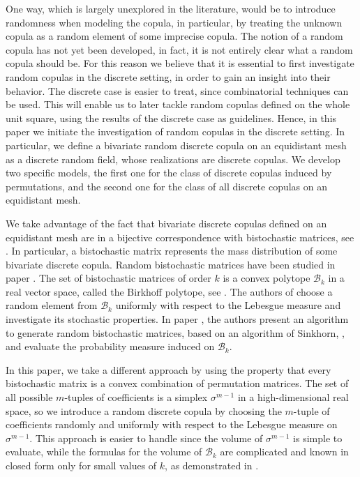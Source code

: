 \documentclass[12pt,a4paper]{amsart}
\theoremstyle{definition}
\begin{document}
One way, which is largely unexplored in the literature, would be to introduce randomness when modeling the copula, in particular, by treating the unknown copula as a random element of some imprecise copula.
The notion of a random copula has not yet been developed, in fact, it is not entirely clear what a random copula should be. For this reason we believe that it is essential to first investigate random copulas in the discrete setting, in order to gain an insight into their behavior. The discrete case is easier to treat, since combinatorial techniques can be used. This will enable us to later tackle random copulas defined on the whole unit square, using the results of the discrete case as guidelines. Hence,
in this paper we initiate the investigation of random copulas in the discrete setting. In particular, we define  a bivariate random discrete copula on an equidistant mesh as a discrete random field, whose realizations are discrete copulas. 
We develop two specific models, the first one for the class of discrete copulas induced by permutations, and the second one for the class of all discrete copulas on an equidistant mesh.

We take advantage of the fact that 
bivariate discrete copulas defined on an equidistant mesh are in a bijective correspondence with bistochastic matrices, see \cite{KolMesMordSem06}. 
In particular, a bistochastic matrix represents the mass distribution of some bivariate discrete copula. Random bistochastic matrices have been studied in paper \cite{ChaDiaSly10}. 
The set of bistochastic matrices of order $k$ is a convex polytope $\mathscr{B}_k$ in a real vector space, called the Birkhoff polytope, see \cite{Zie95}. 
The authors of \cite{ChaDiaSly10} choose a random element from $\mathscr{B}_k$ uniformly with respect to the Lebesgue measure and investigate its stochastic properties. 
In paper \cite{CapSomBruZyc09}, the authors present an algorithm to generate random bistochastic matrices, based on an algorithm of Sinkhorn, \cite{Sin64}, and evaluate the probability measure induced on $\mathscr{B}_k$.


In this paper, we take a different approach by using the property that every bistochastic matrix is a convex combination of permutation matrices. 
The set of all possible $m$-tuples of coefficients is a simplex $\sigma^{m-1}$ in a high-dimensional real space, so we introduce a random discrete copula by choosing the $m$-tuple of coefficients randomly and uniformly with respect to the Lebesgue measure on $\sigma^{m-1}$. 
This approach is easier to handle since the volume of $\sigma^{m-1}$ is simple to evaluate, while the formulas for the volume of $\mathscr{B}_k$ are complicated and known in closed form only for small values of $k$, as demonstrated in \cite{BecPix03}.
\end{document}
